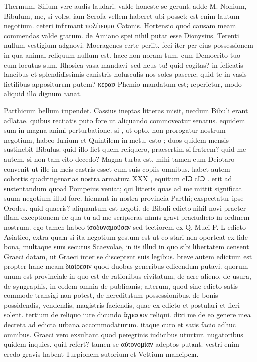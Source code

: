  Thermum, Silium vere audis laudari. valde honeste se gerunt. adde M. Nonium, Bibulum, me, si voles. iam Scrofa vellem haberet ubi posset; est enim lautum negotium. ceteri infirmant πολίτευμα Catonis. Hortensio quod causam meam commendas valde gratum. de Amiano spei nihil putat esse Dionysius. Terenti nullum vestigium adgnovi. Moeragenes certe periit. feci iter per eius possessionem in qua animal reliquum nullum est. haec non noram tum, cum Democrito tuo cum locutus sum. Rhosica vasa mandavi. sed heus tu! quid cogitas? in felicatis lancibus et splendidissimis canistris holusculis nos soles pascere; quid te in vasis fictilibus appositurum putem? κέρασ Phemio mandatum est; reperietur, modo aliquid illo dignum canat.

 Parthicum bellum impendet. Cassius ineptas litteras misit, necdum Bibuli erant adlatae. quibus recitatis puto fore ut aliquando commoveatur senatus. equidem sum in magna animi perturbatione. si , ut opto, non prorogatur nostrum negotium, habeo Iunium et Quintilem in metu. esto ; duos quidem mensis sustinebit Bibulus. quid illo fiet quem reliquero, praesertim si fratrem? quid me autem, si non tam cito decedo? Magna turba est. mihi tamen cum Deiotaro convenit ut ille in meis castris esset cum suis copiis omnibus. habet autem cohortis quadringenarias nostra armatura XXX , equitum cIↃ cIↃ . erit ad sustentandum quoad Pompeius veniat; qui litteris quas ad me mittit significat suum negotium illud fore. hiemant in nostra provincia Parthi; exspectatur ipse Orodes. quid quaeris? aliquantum est negoti. de Bibuli edicto nihil novi praeter illam exceptionem de qua tu ad me scripseras nimis gravi praeiudicio in ordinem nostrum. ego tamen habeo ἰσοδυναμοῦσαν sed tectiorem ex Q. Muci P. L edicto Asiatico, extra quam si ita negotium gestum est ut eo stari non oporteat ex fide bona, multaque sum secutus Scaevolae, in iis illud in quo sibi libertatem censent Graeci datam, ut Graeci inter se disceptent suis legibus. breve autem edictum est propter hanc meam διαίρεσιν quod duobus generibus edicendum putavi. quorum unum est provinciale in quo est de rationibus civitatum, de aere alieno, de usura, de syngraphis, in eodem omnia de publicanis; alterum, quod sine edicto satis commode transigi non potest, de hereditatum possessionibus, de bonis possidendis, vendendis, magistris faciendis, quae ex edicto et postulari et fieri solent. tertium de reliquo iure dicundo ἄγραφον reliqui. dixi me de eo genere mea decreta ad edicta urbana accommodaturum. itaque curo et satis facio adhuc omnibus. Graeci vero exsultant quod peregrinis iudicibus utuntur. nugatoribus quidem inquies. quid refert? tamen se αὐτονομίαν adeptos putant. vestri enim credo gravis habent Turpionem sutorium et Vettium mancipem.

